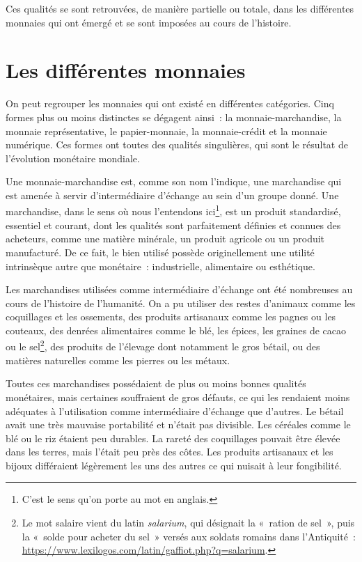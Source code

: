 Ces qualités se sont retrouvées, de manière partielle ou totale, dans les différentes monnaies qui ont émergé et se sont imposées au cours de l'histoire.

\section*{Les différentes monnaies}

On peut regrouper les monnaies qui ont existé en différentes catégories. Cinq formes plus ou moins distinctes se dégagent ainsi~: la monnaie-marchandise, la monnaie représentative, le papier-monnaie, la monnaie-crédit et la monnaie numérique. Ces formes ont toutes des qualités singulières, qui sont le résultat de l'évolution monétaire mondiale.


Une monnaie-marchandise est, comme son nom l'indique, une marchandise qui est amenée à servir d'intermédiaire d'échange au sein d'un groupe donné. Une marchandise, dans le sens où nous l'entendons ici\footnote{C'est le sens qu'on porte au mot  en anglais.}, est un produit standardisé, essentiel et courant, dont les qualités sont parfaitement définies et connues des acheteurs, comme une matière minérale, un produit agricole ou un produit manufacturé. De ce fait, le bien utilisé possède originellement une utilité intrinsèque autre que monétaire~: industrielle, alimentaire ou esthétique.

Les marchandises utilisées comme intermédiaire d'échange ont été nombreuses au cours de l'histoire de l'humanité. On a pu utiliser des restes d'animaux comme les coquillages et les ossements, des produits artisanaux comme les pagnes ou les couteaux, des denrées alimentaires comme le blé, les épices, les graines de cacao ou le sel\footnote{Le mot salaire vient du latin \emph{salarium}, qui désignait la «~ration de sel~», puis la «~solde pour acheter du sel~» versés aux soldats romains dans l'Antiquité~: \url{https://www.lexilogos.com/latin/gaffiot.php?q=salarium}.}, des produits de l'élevage dont notamment le gros bétail, ou des matières naturelles comme les pierres ou les métaux.

\clearpage
Toutes ces marchandises possédaient de plus ou moins bonnes qualités monétaires, mais certaines souffraient de gros défauts, ce qui les rendaient moins adéquates à l'utilisation comme intermédiaire d'échange que d'autres. Le bétail avait une très mauvaise portabilité et n'était pas divisible. Les céréales comme le blé ou le riz étaient peu durables. La rareté des coquillages pouvait être élevée dans les terres, mais l'était peu près des côtes. Les produits artisanaux et les bijoux différaient légèrement les uns des autres ce qui nuisait à leur fongibilité.

